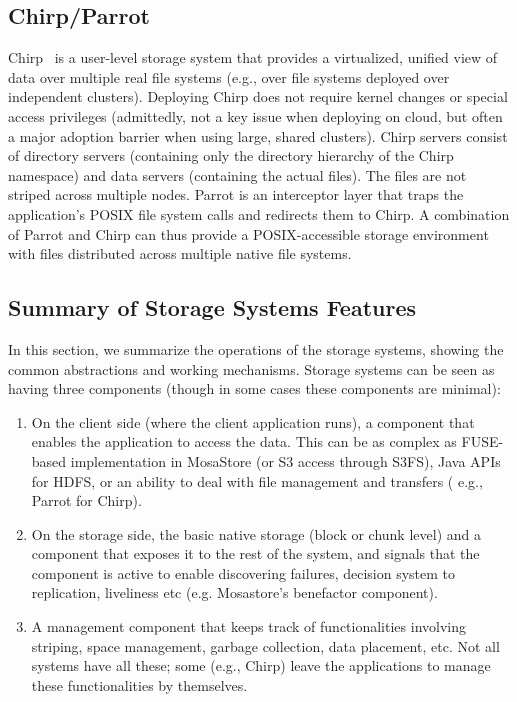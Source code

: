 \documentclass[10pt,journal,cspaper,compsoc]{IEEEtran}
\begin{document}
\subsection{Chirp/Parrot}
Chirp~\cite{chirp} is a user-level storage system that provides a virtualized,
unified view of data over multiple real file systems (e.g., over file systems
deployed over independent clusters). Deploying Chirp does not require kernel
changes or special access privileges (admittedly, not a key issue when
deploying on cloud, but often a major adoption barrier when using large, shared
clusters). Chirp servers consist of directory servers (containing only the
directory hierarchy of the Chirp name\-space) and data servers (containing the
actual files). The files are not striped across multiple nodes. Parrot is an
interceptor layer that traps the application's POSIX file system calls and
redirects them to Chirp. A combination of Parrot and Chirp can thus provide a
POSIX-accessible storage environment with files distributed across multiple
native file systems.

\subsection{Summary of Storage Systems Features}
In this section, we summarize the operations of the storage systems, showing
the common abstractions and working mechanisms. Storage systems can be seen as
having three components (though in some cases these components are minimal):

\begin{enumerate}
\item On the client side (where the client application runs), a component
    that enables the application to access the data.  This can be as complex as
    FUSE-based implementation in MosaStore (or S3 access through S3FS),
    Java APIs for HDFS, or an ability to deal with file
    management and transfers ( e.g., Parrot for Chirp).

\item On the storage side, the basic native storage (block or chunk level) and a
    component that exposes it to the rest of the system, and signals that the
    component is active to enable discovering failures, decision system to
    replication, liveliness etc (e.g. Mosastore's benefactor component). 

\item A management component that keeps track of functionalities involving
    striping, space management, garbage collection, data placement, etc.  Not
    all systems have all these; some (e.g., Chirp) leave the applications to
    manage these functionalities by themselves.
\end{enumerate}
\end{document}
